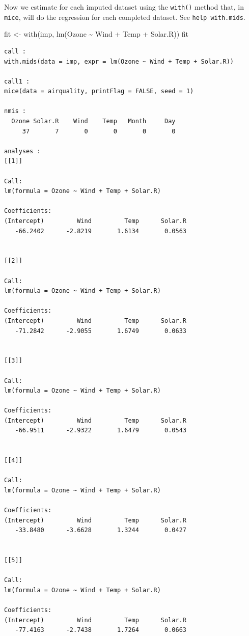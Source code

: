 \documentclass[
  letterpaper,
  DIV=11,
  numbers=noendperiod]{scrreprt}
\newenvironment{Shaded}{}{}
\newcommand{\FunctionTok}[1]{\textcolor[rgb]{0.02,0.16,0.49}{#1}}
\newcommand{\NormalTok}[1]{#1}
\newcommand{\OtherTok}[1]{\textcolor[rgb]{0.00,0.44,0.13}{#1}}
\newcommand{\SpecialCharTok}[1]{\textcolor[rgb]{0.25,0.44,0.63}{#1}}
\begin{document}
Now we estimate for each imputed dataset using the \texttt{with()}
method that, in \texttt{mice}, will do the regression for each completed
dataset. See \texttt{help\ with.mids}.

\begin{Shaded}
\begin{Highlighting}[]
\NormalTok{  fit }\OtherTok{\textless{}{-}} \FunctionTok{with}\NormalTok{(imp, }\FunctionTok{lm}\NormalTok{(Ozone }\SpecialCharTok{\textasciitilde{}}\NormalTok{ Wind }\SpecialCharTok{+}\NormalTok{ Temp }\SpecialCharTok{+}\NormalTok{ Solar.R))}
\NormalTok{  fit}
\end{Highlighting}
\end{Shaded}

\begin{verbatim}
call :
with.mids(data = imp, expr = lm(Ozone ~ Wind + Temp + Solar.R))

call1 :
mice(data = airquality, printFlag = FALSE, seed = 1)

nmis :
  Ozone Solar.R    Wind    Temp   Month     Day 
     37       7       0       0       0       0 

analyses :
[[1]]

Call:
lm(formula = Ozone ~ Wind + Temp + Solar.R)

Coefficients:
(Intercept)         Wind         Temp      Solar.R  
   -66.2402      -2.8219       1.6134       0.0563  


[[2]]

Call:
lm(formula = Ozone ~ Wind + Temp + Solar.R)

Coefficients:
(Intercept)         Wind         Temp      Solar.R  
   -71.2842      -2.9055       1.6749       0.0633  


[[3]]

Call:
lm(formula = Ozone ~ Wind + Temp + Solar.R)

Coefficients:
(Intercept)         Wind         Temp      Solar.R  
   -66.9511      -2.9322       1.6479       0.0543  


[[4]]

Call:
lm(formula = Ozone ~ Wind + Temp + Solar.R)

Coefficients:
(Intercept)         Wind         Temp      Solar.R  
   -33.8480      -3.6628       1.3244       0.0427  


[[5]]

Call:
lm(formula = Ozone ~ Wind + Temp + Solar.R)

Coefficients:
(Intercept)         Wind         Temp      Solar.R  
   -77.4163      -2.7438       1.7264       0.0663  
\end{verbatim}
\end{document}
